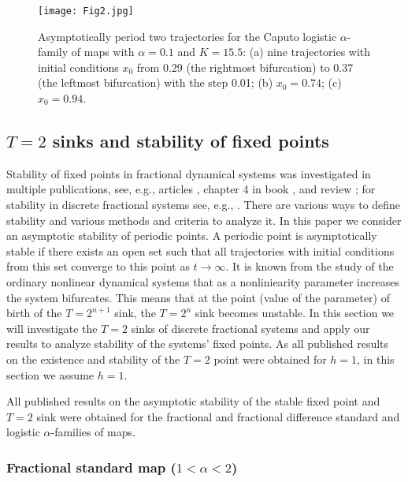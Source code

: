 \documentclass[graybox]{svmult}
\begin{document}
\begin{figure}[!t]
\begin{center}
\texttt{[image: Fig2.jpg]}
\vspace{-0.25cm}
\caption{Asymptotically period two trajectories for the Caputo logistic
 $\alpha$-family of maps with  $\alpha=0.1$ and $K=15.5$: (a) nine
 trajectories with initial conditions $x_0$ from 0.29 (the rightmost
 bifurcation) to 0.37 (the leftmost bifurcation) with the step 0.01;
(b) $x_0=0.74$; (c) $x_0=0.94$.
}
\end{center}
\label{brT2}
\end{figure}

\subsection{$T=2$ sinks and stability of fixed points}
\label{T2section}

Stability of fixed points in fractional dynamical systems was investigated
in multiple publications, see, e.g., articles \cite{StA,StL,StM}, chapter
4 in book \cite{Petras}, and review \cite{StRev2013}; for stability in 
discrete fractional systems see, e.g., \cite{StB,ME1,StDis1}. There are
various ways to define stability and various methods and criteria 
to analyze it. In this paper we consider an asymptotic stability of
periodic points. A periodic point is asymptotically stable if there exists
an open set such that all trajectories with initial conditions from this set  
converge to this point as $t \rightarrow \infty$. It is known from the
study of the ordinary nonlinear dynamical systems that as a
nonliniearity parameter increases the system bifurcates. This means that
at the point (value of the parameter) of birth of the $T=2^{n+1}$ sink, the  
$T=2^{n}$ sink becomes unstable. In this section we will investigate the
$T=2$ sinks of discrete fractional systems and apply our results to
analyze stability of the systems' fixed points. As all published results on the existence and stability of the $T=2$ point were obtained for $h=1$, in this section we assume $h=1$.




All published results on the asymptotic stability of the stable fixed point and $T=2$ sink were obtained for the fractional and fractional difference standard and logistic $\alpha$-families of maps.

\subsubsection{Fractional standard map ($1<\alpha<2$)}
\label{alp1_2FSM}
\end{document}
